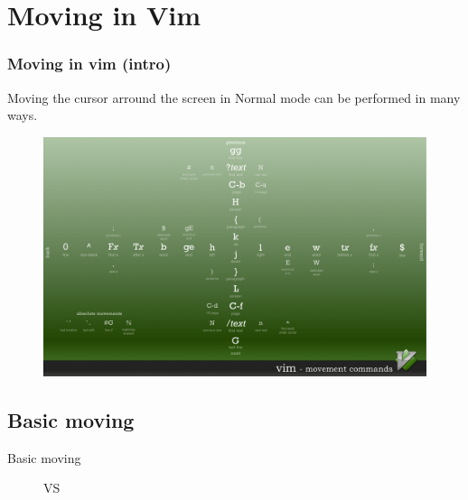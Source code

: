 \documentclass{beamer}
\begin{document}
  \section{Moving in Vim}
  \begin{frame}
    \frametitle{Moving in vim (intro)}
  Moving the cursor arround the screen in Normal mode can be performed in many ways. 
  \begin{figure}
      \includegraphics[width=0.8\linewidth]{graphics/movement.png}
    \end{figure}
  \end{frame}
  \subsection{Basic moving}
  \begin{frame}{Basic moving}
    \begin{figure}[htp] 
    \centering
    VS
    \end{figure}
  \end{frame}
\end{document}
